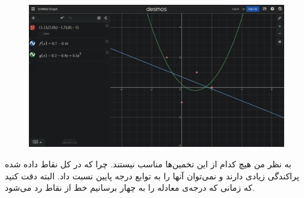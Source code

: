 \begin{figure}[H]
    \centerline{\includegraphics[scale=0.275]{pics/2-3.jpeg}}
\end{figure}
\noindent
به نظر من هیچ کدام از این تخمین‌ها مناسب نیستند. چرا که در کل نقاط داده شده پراکندگی زیادی دارند و نمی‌توان
آنها را به توابع درجه پایین نسبت داد. البته دقت کنید که زمانی که درجه‌ی معادله را به چهار برسانیم
خط از نقاط رد می‌شود.





